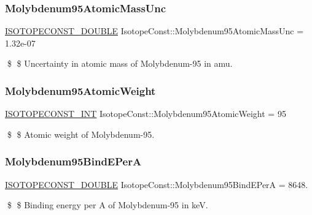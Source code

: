 \subsubsection{\texorpdfstring{Molybdenum95\+Atomic\+Mass\+Unc}{Molybdenum95AtomicMassUnc}}
{\footnotesize\ttfamily \mbox{\hyperlink{group___isotope_const-_macros_ga8f45a7272ce02c0b4c65c44636ed719a}{I\+S\+O\+T\+O\+P\+E\+C\+O\+N\+S\+T\+\_\+\+D\+O\+U\+B\+LE}} Isotope\+Const\+::\+Molybdenum95\+Atomic\+Mass\+Unc = 1.\+32e-\/07}

\$ \$ Uncertainty in atomic mass of Molybdenum-\/95 in amu. \mbox{\label{group___isotope_const-_molybdenum-_mo95_ga14f165abf8d85076ddf4bbf37f0f3785}} 
\subsubsection{\texorpdfstring{Molybdenum95\+Atomic\+Weight}{Molybdenum95AtomicWeight}}
{\footnotesize\ttfamily \mbox{\hyperlink{group___isotope_const-_macros_ga5f18360b3e99483a35c32d789e62621c}{I\+S\+O\+T\+O\+P\+E\+C\+O\+N\+S\+T\+\_\+\+I\+NT}} Isotope\+Const\+::\+Molybdenum95\+Atomic\+Weight = 95}

\$ \$ Atomic weight of Molybdenum-\/95. \mbox{\label{group___isotope_const-_molybdenum-_mo95_gaf91d246e32c41f7f11be822b1a9028c1}} 
\subsubsection{\texorpdfstring{Molybdenum95\+Bind\+E\+PerA}{Molybdenum95BindEPerA}}
{\footnotesize\ttfamily \mbox{\hyperlink{group___isotope_const-_macros_ga8f45a7272ce02c0b4c65c44636ed719a}{I\+S\+O\+T\+O\+P\+E\+C\+O\+N\+S\+T\+\_\+\+D\+O\+U\+B\+LE}} Isotope\+Const\+::\+Molybdenum95\+Bind\+E\+PerA = 8648.}

\$ \$ Binding energy per A of Molybdenum-\/95 in keV. \mbox{\label{group___isotope_const-_molybdenum-_mo95_gae50d8524526c41331a65a460047f4a4f}} 
